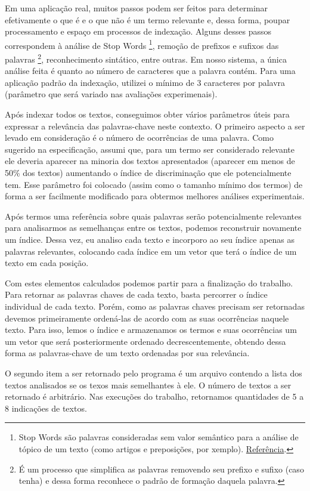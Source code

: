 \documentclass[12pt]{article}
\begin{document}
Em uma aplicação real, muitos passos podem ser feitos para determinar
efetivamente o que é e o que não é um termo relevante e, dessa forma, poupar
processamento e espaço em processos de indexação. Alguns desses passos
correspondem à análise de Stop Words \footnote{Stop Words são palavras consideradas sem valor
semântico para a análise de tópico de um texto (como artigos e preposições, por
xemplo). \href{http://searchenginewatch.com/2156061}{Referência}.}, remoção de
prefixos e sufixos das palavras \footnote{É um processo que simplifica as
palavras removendo seu prefixo e sufixo (caso tenha) e dessa forma reconhece o
padrão de formação daquela palavra.}, reconhecimento sintático, entre outras. 
Em nosso sistema, a única análise feita é quanto ao número de caracteres que a 
palavra contém. Para uma aplicação padrão da indexação, utilizei o mínimo de 3 
caracteres por palavra (parâmetro que será variado nas avaliações experimenais).

Após indexar todos os textos, conseguimos obter vários parâmetros úteis para
expressar a relevância das palavras-chave neste contexto. O primeiro aspecto a ser
levado em consideração é o número de ocorrências de uma palavra. Como sugerido
na especificação, assumi que, para um termo ser considerado relevante ele
deveria aparecer na minoria dos textos apresentados (aparecer em menos de 50\%
dos textos) aumentando o índice de discriminação que ele potencialmente tem.
Esse parâmetro foi colocado (assim como o tamanho mínimo dos termos) de forma a
ser facilmente modificado para obtermos melhores análises experimentais.

Após termos uma referência sobre quais palavras serão potencialmente relevantes
para analisarmos as semelhanças entre os textos, podemos reconstruir novamente
um índice. Dessa vez, eu analiso cada texto e incorporo ao seu índice apenas as
palavras relevantes, colocando cada índice em um vetor que terá o índice de um texto 
em cada posição.

Com estes elementos calculados podemos partir para a finalização do trabalho.
Para retornar as palavras chaves de cada texto, basta percorrer o índice
individual de cada texto. Porém, como as palavras chaves precisam ser retornadas
devemos primeiramente ordená-las de acordo com as suas ocorrências naquele
texto. Para isso, lemos o índice e armazenamos os termos e suas ocorrências um
um vetor que será posteriormente ordenado decrescentemente, obtendo dessa forma
as palavras-chave de um texto ordenadas por sua relevância.

O segundo item a ser retornado pelo programa é um arquivo contendo a lista dos
textos analisados se os texos mais semelhantes à ele. O número de textos a ser
retornado é arbitrário. Nas execuções do trabalho, retornamos quantidades de 5 a
8 indicações de textos.
\end{document}
